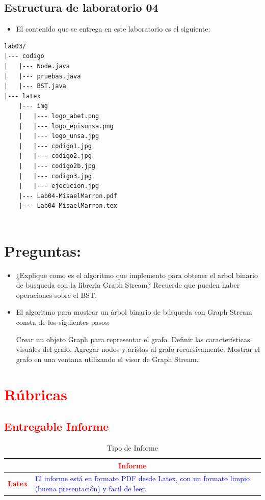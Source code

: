 \documentclass{article}
\begin{document}
	
	
	\subsection{Estructura de laboratorio 04}
	\begin{itemize}	
		\item El contenido que se entrega en este laboratorio es el siguiente:
	\end{itemize}
	
\begin{lstlisting}[style=ascii-tree]
lab03/
|--- codigo
|   |--- Node.java
|   |--- pruebas.java
|   |--- BST.java
|--- latex
    |--- img
    |   |--- logo_abet.png
    |   |--- logo_episunsa.png
    |   |--- logo_unsa.jpg
    |   |--- codigo1.jpg
    |   |--- codigo2.jpg
    |   |--- codigo2b.jpg
    |   |--- codigo3.jpg
    |   |--- ejecucion.jpg
    |--- Lab04-MisaelMarron.pdf    
    |--- Lab04-MisaelMarron.tex
    
\end{lstlisting}    

\section{Preguntas: }
	\begin{itemize}
		\item ¿Explique como es el algoritmo que implemento para obtener el  arbol binario de busqueda con
la libreria Graph Stream? Recuerde que pueden haber operaciones sobre el BST.
	\item El algoritmo para mostrar un árbol binario de búsqueda con Graph Stream consta de los siguientes pasos:

Crear un objeto Graph para representar el grafo.
Definir las características visuales del grafo.
Agregar nodos y aristas al grafo recursivamente.
Mostrar el grafo en una ventana utilizando el visor de Graph Stream.
	\end{itemize}	
		
	\section{\textcolor{red}{Rúbricas}}
	
	\subsection{\textcolor{red}{Entregable Informe}}
	\begin{table}[H]
		\caption{Tipo de Informe}
		\setlength{\tabcolsep}{0.5em} %
		{\renewcommand{\arraystretch}{1.5}%
		\begin{tabular}{|p{3cm}|p{12cm}|}
			\hline
			\multicolumn{2}{|c|}{\textbf{\textcolor{red}{Informe}}}  \\
			\hline 
			\textbf{\textcolor{red}{Latex}} & \textcolor{blue}{El informe está en formato PDF desde Latex,  con un formato limpio (buena presentación) y facil de leer.}   \\ 
			\hline 
			
			
		\end{tabular}
	}
	\end{table}
	
\end{document}
